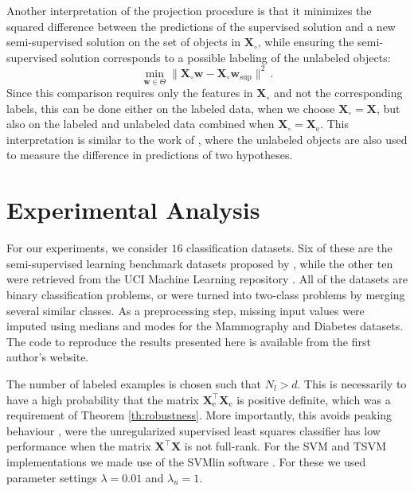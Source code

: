 \documentclass[smallcondensed]{svjour3}\usepackage[]{graphicx}\usepackage[]{color}
\newcommand{\Xe}{\vec{X}_\mathrm{e}  }
\renewcommand{\vec}[1]{\mathbf{#1}}
\begin{document}
Another interpretation of the projection procedure is that it minimizes the squared difference between the predictions of the supervised solution and a new semi-supervised solution on the set of objects in $\vec{X}_{\circ}$, while ensuring the semi-supervised solution corresponds to a possible labeling of the unlabeled objects:
\begin{equation}
\min_{\vec{w} \in \Theta} \lVert \vec{X}_{\circ} \vec{w} - \vec{X}_{\circ} \vec{w}_\text{sup} \lVert^2 \,.\nonumber
\end{equation}
Since this comparison requires only the features in $\vec{X}_{\circ}$ and not the corresponding labels, this can be done either on the labeled data, when we choose $\vec{X}_{\circ}=\vec{X}$, but also on the labeled and unlabeled data combined when $\vec{X}_{\circ}=\Xe$. This interpretation is similar to the work of \cite{Schuurmans2002}, where the unlabeled objects are also used to measure the difference in predictions of two hypotheses. 

\section{Experimental Analysis}
\label{section:empirical}
For our experiments, we consider $16$ classification datasets. Six of these are the semi-supervised learning benchmark datasets proposed by \citet{Chapelle2006}, while the other ten were retrieved from the UCI Machine Learning repository \citep{Lichman2013}. All of the datasets are binary classification problems, or were turned into two-class problems by merging several similar classes. As a preprocessing step, missing input values were imputed using medians and modes for the Mammography and Diabetes datasets. The code to reproduce the results presented here is available from the first author's website.

The number of labeled examples is chosen such that $N_l>d$. This is necessarily to have a high probability that the matrix $\vec{X}_\text{e}^\top \vec{X}_\text{e}$ is positive definite, which was a requirement of Theorem \ref{th:robustness}. More importantly, this avoids peaking behaviour \citep{Raudys1998, Opper1996}, were the unregularized supervised least squares classifier has low performance when the matrix $\vec{X}^\top \vec{X}$ is not full-rank. For the SVM and TSVM implementations we made use of the SVMlin software \citep{Sindhwani2006}. For these we used parameter settings $\lambda=0.01$ and $\lambda_u=1$.
\end{document}
